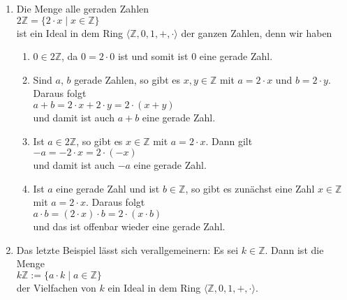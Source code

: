 \examples
\begin{enumerate}
\item Die Menge alle geraden Zahlen
      \\[0.2cm]
      \hspace*{1.3cm}
      $2 \mathbb{Z} = \{ 2 \cdot x \mid x \in \mathbb{Z} \}$
      \\[0.2cm]
      ist ein Ideal in dem Ring $\langle \mathbb{Z}, 0, 1, +, \cdot \rangle$ der ganzen
      Zahlen, denn wir haben
      \begin{enumerate}
      \item $0 \in 2\mathbb{Z}$, da $0 = 2 \cdot 0$ ist und somit ist $0$ eine gerade Zahl.
      \item Sind $a$, $b$ gerade Zahlen, so gibt es $x,y \in \mathbb{Z}$ mit $a = 2 \cdot x$ und 
            $b = 2 \cdot y$.  Daraus folgt
            \\[0.2cm]
            \hspace*{1.3cm}
            $a + b = 2 \cdot x + 2 \cdot y = 2 \cdot (x + y)$
            \\[0.2cm]
            und damit ist auch $a+b$ eine gerade Zahl.
      \item Ist $a \in 2\mathbb{Z}$, so gibt es $x \in \mathbb{Z}$ mit $a = 2 \cdot x$.  Dann gilt
            \\[0.2cm]
            \hspace*{1.3cm}
            $-a = - 2 \cdot x = 2 \cdot (-x)$
            \\[0.2cm]
            und damit ist auch $-a$ eine gerade Zahl.
      \item Ist $a$ eine gerade Zahl und ist $b \in \mathbb{Z}$, so gibt es zunächst eine
            Zahl $x \in \mathbb{Z}$ mit $a = 2 \cdot x$.  Daraus folgt
            \\[0.2cm]
            \hspace*{1.3cm}
            $a \cdot b = (2 \cdot x) \cdot b = 2 \cdot (x \cdot b)$
            \\[0.2cm]
            und das ist offenbar wieder eine gerade Zahl.
      \end{enumerate}
\item Das letzte Beispiel lässt sich verallgemeinern: Es sei $k \in \mathbb{Z}$. Dann ist die Menge 
      \\[0.2cm]
      \hspace*{1.3cm}
      $k\mathbb{Z} := \{ a \cdot k \mid a \in \mathbb{Z} \}$
      \\[0.2cm]
      der Vielfachen von $k$  ein Ideal in dem Ring $\langle \mathbb{Z}, 0, 1, +, \cdot \rangle$.

\end{enumerate}
